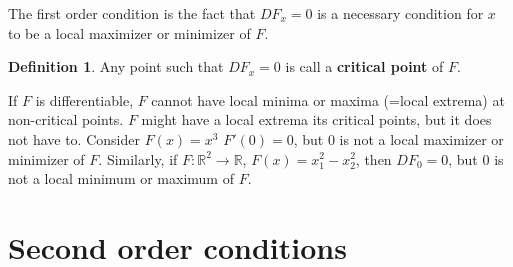 \documentclass[12pt,reqno]{amsart}
\theoremstyle{definition}
\newtheorem{definition}{Definition}[section]
\def\R{\mathbb{R}}
\renewcommand{\to}{{\rightarrow}}
\begin{document}
The first order condition is the fact that $DF_x = 0$ is a necessary
condition for $x$ to be a local maximizer or minimizer of $F$. 
\begin{definition}
  Any point such that $DF_x = 0$ is call a \textbf{critical point} of
  $F$. 
\end{definition}
If $F$ is differentiable, $F$ cannot have local minima or maxima
(=local extrema) at non-critical points. $F$ might have a local
extrema its critical points, but it does not have to. Consider $F(x) =
x^3$ $F'(0) = 0$, but $0$ is not a local maximizer or minimizer of
$F$. Similarly, if $F:\R^2 \to \R$, $F(x) = x_1^2 - x_2^2$, then $DF_0
= 0$, but $0$ is not a local minimum or maximum of $F$.

\section{Second order conditions}
\end{document}
